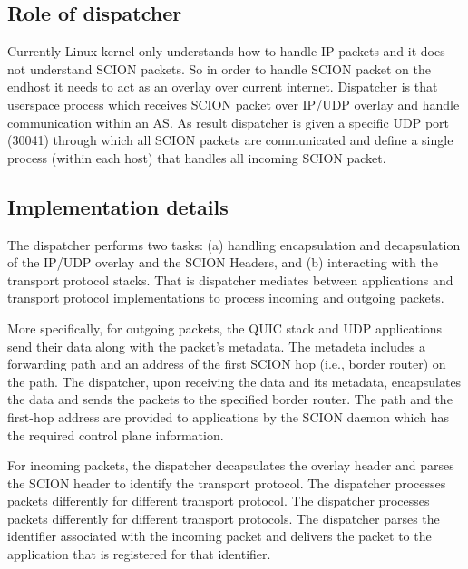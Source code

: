 \subsection{Role of dispatcher}
Currently Linux kernel only understands how to handle IP packets and it does not understand SCION packets. So in order to handle SCION packet on the endhost it needs to act as an overlay over current internet. Dispatcher is that userspace process which receives SCION packet over IP/UDP overlay and handle communication within an AS. As result dispatcher is given a specific UDP port (30041) through which all SCION packets are communicated and define a single process (within each host) that handles all incoming SCION packet.

\subsection{Implementation details}
The dispatcher performs two tasks: (a) handling encapsulation and decapsulation of the IP/UDP overlay and the SCION Headers, and (b) interacting with the transport protocol stacks. That is dispatcher mediates between applications and transport protocol implementations to process incoming and outgoing packets.

More specifically, for outgoing packets, the QUIC stack and UDP applications send their data along with the packet's metadata. The metadeta includes a forwarding path and an address of the first SCION hop (i.e., border router) on the path. The dispatcher, upon receiving the data and its metadata, encapsulates the data and sends the packets to the specified border router. The path and the first-hop address are provided to applications by the SCION daemon which has the required control plane information.

For incoming packets, the dispatcher decapsulates the overlay header and parses the SCION header to identify the transport protocol. The dispatcher processes packets differently for different transport protocol. The dispatcher processes packets differently for different transport protocols. The dispatcher parses the identifier associated with the incoming packet and delivers the packet to the application that is registered for that identifier.

